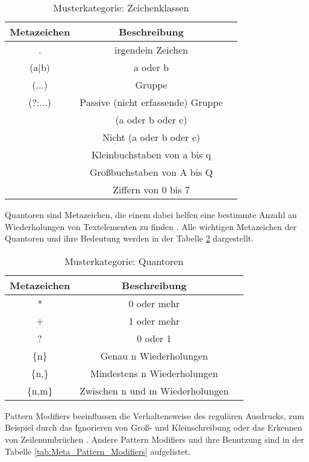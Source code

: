 \begin{table}[H]
\centering
\begin{tabular}{|c|c|p{8cm}|}
\hline
\textbf{Metazeichen} & \textbf{Beschreibung} \\ 
\hline
.  & irgendein Zeichen \\ 
\hline
(a|b)  & a oder b  \\ 
\hline
(...)  & Gruppe  \\ 
\hline
(?:...)  & Passive (nicht erfassende) Gruppe  \\ 
\hline
[abc]  & (a oder b oder c)  \\ 
\hline
[\^{}abc]  & Nicht (a oder b oder c)  \\ 
\hline
[a-q] & Kleinbuchstaben von a bis q  \\ 
\hline
[A-Q] & Großbuchstaben von A bis Q  \\ 
\hline
[0-7] & Ziffern von 0 bis 7  \\ 
\hline
\end{tabular}
\caption{Musterkategorie: Zeichenklassen}
\label{tab:Meta_Zeichenklassen}
\end{table}

Quantoren sind Metazeichen, die einem dabei helfen eine bestimmte Anzahl an Wiederholungen von Textelementen zu finden \cite[S.18 ff.]{friedl2009regulare}. Alle wichtigen Metazeichen der Quantoren und ihre Bedeutung werden in der Tabelle \ref{tab:Meta_Quantoren} dargestellt.

\begin{table}[H]
\centering
\begin{tabular}{|c|c|p{8cm}|}
\hline
\textbf{Metazeichen} & \textbf{Beschreibung} \\ 
\hline
*  & 0 oder mehr \\ 
\hline
+  & 1 oder mehr  \\ 
\hline
?  & 0 oder 1  \\ 
\hline
\{n\}  & Genau n Wiederholungen  \\ 
\hline
\{n,\}  & Mindestens n Wiederholungen  \\ 
\hline
\{n,m\}  & Zwischen n und m Wiederholungen  \\ 
\hline
\end{tabular}
\caption{Musterkategorie: Quantoren}
\label{tab:Meta_Quantoren}
\end{table}

Pattern Modifiers beeinflussen die Verhaltensweise des regulären Ausdrucks, zum Beispiel durch das Ignorieren von Groß- und Kleinschreibung oder das Erkennen von Zeilenumbrüchen \cite[S.47 ff.]{friedl2009regulare}. Andere Pattern Modifiers und ihre Benutzung sind in der Tabelle \ref{tab:Meta_Pattern_Modifiers} aufgelistet.


